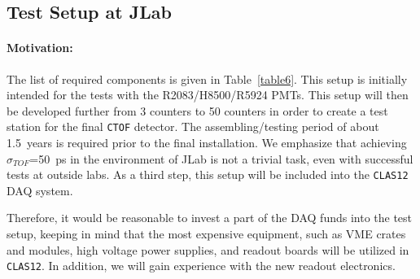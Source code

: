 \documentclass[12pt]{article}
\begin{document}
\subsection{Test Setup at JLab}

\paragraph{Motivation:}
The list of required components is given in Table~\ref{table6}.  This setup 
is initially intended for the tests with the R2083/H8500/R5924 PMTs.  This
setup will then be developed further from 3 counters to 50 counters in order 
to create a test station for the final {\tt CTOF} detector.  The 
assembling/testing period of about 1.5~years is required prior to the final 
installation.  We emphasize that achieving $\sigma_{TOF}$=50~ps in the 
environment of JLab is not a trivial task, even with successful tests at 
outside labs.  As a third step, this setup will be included into the 
{\tt CLAS12} DAQ system.

Therefore, it would be reasonable to invest a part of the DAQ funds 
into the test setup, keeping in mind that the most expensive equipment,
such as VME crates and modules, high voltage power supplies, and readout
boards will be utilized in {\tt CLAS12}.  In addition, we will gain 
experience with the new readout electronics.
\end{document}
